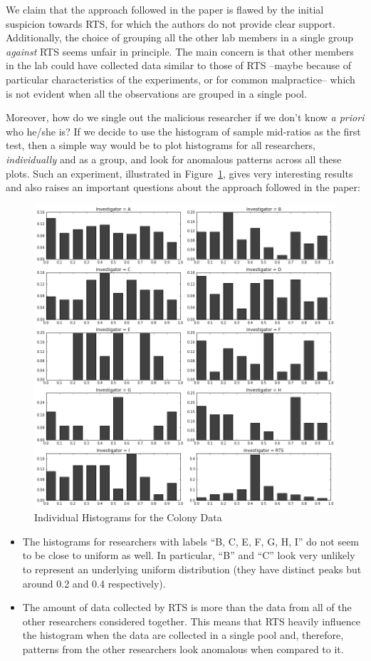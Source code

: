 \documentclass{article}
\begin{document}
We claim that the approach followed in the paper is flawed by the initial suspicion towards RTS, for which the authors do not provide clear support.
Additionally, the choice of grouping all the other lab members in a single group \textit{against} RTS seems unfair in principle.
The main concern is that other members in the lab could have collected data similar to those of RTS --maybe because of particular characteristics of the experiments, or for common malpractice-- which is not evident when all the observations are grouped in a single pool.

Moreover, how do we single out the
malicious researcher if we don't know \textit{a priori} who he/she is? 
If we decide to use the histogram of sample mid-ratios as the first test, 
then a simple
way would be to plot histograms for all researchers, \textit{individually} and as a group, and look for anomalous patterns
across all these plots. 
Such an experiment, illustrated in Figure~\ref{fig:individuals}, gives very
interesting results and also raises an important questions about the approach followed in the paper:
\begin{figure}[H]
\label{fig:individuals}
\centering
\includegraphics[width=0.8\linewidth]{images/new_mid_ratio.png}
\caption{Individual Histograms for the Colony Data}
\end{figure}

\begin{itemize}
\item
  The histograms for researchers with labels ``B, C, E, F, G, H, I'' do not
  seem to be close to uniform as well. 
  In particular, ``B'' and ``C''
  look very unlikely to represent an underlying
  uniform distribution (they have distinct peaks but around 0.2 and 0.4
  respectively).
\item
 The amount of data collected by RTS is more than the data from all of the other researchers considered together.
 This means that RTS heavily influence the histogram when the data are collected in a single pool and, therefore, patterns from the other
  researchers look anomalous when compared to it.
\end{itemize}
\end{document}
